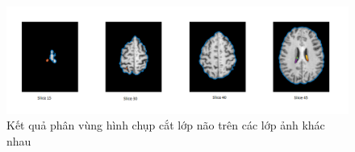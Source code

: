 \documentclass[12pt,oneside,a4]{report}
\begin{document}
\begin{center}
\begin{figure}
\caption{Kết quả phân vùng hình chụp cắt lớp não trên các lớp ảnh khác nhau}
\includegraphics[scale=0.5]{figure/brainslice1.png}
\end{figure}
\end{center}
\end{document}
